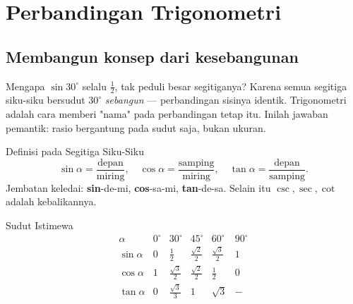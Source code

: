 \documentclass[11pt,a4paper]{report}
\theoremstyle{gaya}
\begin{document}
\section{Perbandingan Trigonometri}

\subsection*{Membangun konsep dari kesebangunan}
Mengapa $\sin 30^\circ$ selalu $\tfrac12$, tak peduli besar segitiganya? Karena semua segitiga siku-siku bersudut $30^\circ$ \emph{sebangun} --- perbandingan sisinya identik. Trigonometri adalah cara memberi "nama" pada perbandingan tetap itu. Inilah jawaban pemantik: rasio bergantung pada sudut saja, bukan ukuran.

\begin{center}
\end{center}

\begin{konsep}{Definisi pada Segitiga Siku-Siku}
\[
\sin\alpha = \frac{\text{depan}}{\text{miring}},\quad
\cos\alpha = \frac{\text{samping}}{\text{miring}},\quad
\tan\alpha = \frac{\text{depan}}{\text{samping}}.
\]
Jembatan keledai: \textbf{sin}-de-mi, \textbf{cos}-sa-mi, \textbf{tan}-de-sa. Selain itu $\csc,\sec,\cot$ adalah kebalikannya.
\end{konsep}

\begin{konsep}{Sudut Istimewa}
\[
\begin{array}{c|ccccc}
\alpha & 0^\circ & 30^\circ & 45^\circ & 60^\circ & 90^\circ\\\hline
\sin\alpha & 0 & \frac12 & \frac{\sqrt2}{2} & \frac{\sqrt3}{2} & 1\\[4pt]
\cos\alpha & 1 & \frac{\sqrt3}{2} & \frac{\sqrt2}{2} & \frac12 & 0\\[4pt]
\tan\alpha & 0 & \frac{\sqrt3}{3} & 1 & \sqrt3 & -\\
\end{array}
\]
\end{konsep}
\end{document}
